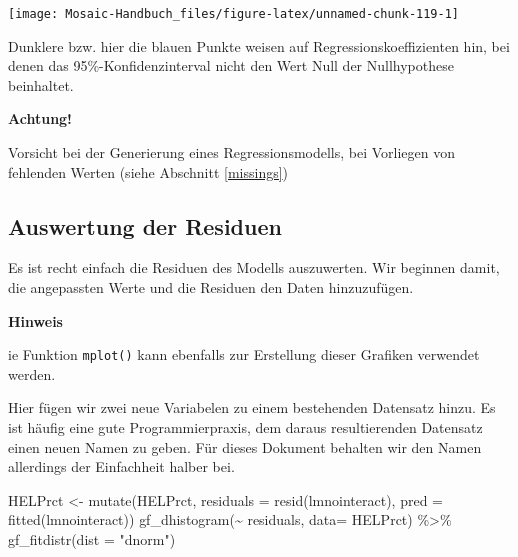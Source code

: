 \documentclass[
  ngerman,
]{scrbook}
\newenvironment{Shaded}{\begin{snugshade}}{\end{snugshade}}
\newcommand{\AttributeTok}[1]{\textcolor[rgb]{0.77,0.63,0.00}{#1}}
\newcommand{\FunctionTok}[1]{\textcolor[rgb]{0.00,0.00,0.00}{#1}}
\newcommand{\NormalTok}[1]{#1}
\newcommand{\OtherTok}[1]{\textcolor[rgb]{0.56,0.35,0.01}{#1}}
\newcommand{\SpecialCharTok}[1]{\textcolor[rgb]{0.00,0.00,0.00}{#1}}
\newcommand{\StringTok}[1]{\textcolor[rgb]{0.31,0.60,0.02}{#1}}
\newenvironment{hinweis}[1]
  {
  \begin{itemize}
  \renewcommand{\labelitemi}{
    \raisebox{1.8\height}[0pt][0pt]{
      {\setkeys{Gin}{width=7em,keepaspectratio}
        {\Large \textcolor{dark-fom-green}\faHandORight}}
        }
  }
  \begin{blackbox}
        \bgroup\color{dark-fom-green}
          {\textbf{Hinweis}}
        \egroup
  \item
  }
  {
  \end{blackbox}
  \end{itemize}
  }
\newenvironment{achtung}[1]
  {
  \begin{itemize}
  \renewcommand{\labelitemi}{
    \raisebox{1.8\height}[0pt][0pt]{
      {\setkeys{Gin}{width=7em,keepaspectratio}
        {\Large \textcolor{dark-fom-green}\faExclamationCircle}}
        }
  }
  \begin{blackbox}
        \bgroup\color{dark-fom-green}
          {\textbf{Achtung!}}
        \egroup
  \item
  }
  {
  \end{blackbox}
  \end{itemize}
  }
\newenvironment{note}[1]
  {
  \begin{itemize}
  \renewcommand{\labelitemi}{
    \raisebox{-.01\height}[0pt][0pt]{
      {\setkeys{Gin}{width=7em,keepaspectratio}
        {\normalsize \textcolor{dark-fom-green}\faHashtag}}
        }
  }
  \begin{blackbox}
   \item
    }
    {
  \end{blackbox}
  \end{itemize}
  }
\begin{document}
\begin{center}\texttt{[image: Mosaic-Handbuch\_files/figure-latex/unnamed-chunk-119-1]} \end{center}

\begin{note}{note}
Dunklere bzw. hier die blauen Punkte weisen auf Regressionskoeffizienten hin, bei denen das 95\%-Konfidenzinterval nicht den Wert Null der Nullhypothese beinhaltet.

\end{note}

\begin{achtung}{achtung}
Vorsicht bei der Generierung eines Regressionsmodells, bei Vorliegen von fehlenden Werten (siehe Abschnitt \ref{missings})

\end{achtung}

\hypertarget{auswertung-der-residuen}{%
\subsection{Auswertung der Residuen}\label{auswertung-der-residuen}}

Es ist recht einfach die Residuen des Modells auszuwerten. Wir beginnen damit, die angepassten Werte und die Residuen den Daten hinzuzufügen.

\begin{hinweis}
Die Funktion \texttt{mplot()} kann ebenfalls zur Erstellung dieser Grafiken verwendet werden.

\end{hinweis}

\begin{note}{note}
Hier fügen wir zwei neue Variabelen zu einem bestehenden Datensatz hinzu. Es ist häufig eine gute Programmierpraxis, dem daraus resultierenden Datensatz einen neuen Namen zu geben. Für dieses Dokument behalten wir den Namen allerdings der Einfachheit halber bei.

\end{note}

\begin{Shaded}
\begin{Highlighting}[]
\NormalTok{HELPrct }\OtherTok{\textless{}{-}} \FunctionTok{mutate}\NormalTok{(HELPrct, }
                  \AttributeTok{residuals =} \FunctionTok{resid}\NormalTok{(lmnointeract), }
                  \AttributeTok{pred =} \FunctionTok{fitted}\NormalTok{(lmnointeract))}
\FunctionTok{gf\_dhistogram}\NormalTok{(}\SpecialCharTok{\textasciitilde{}}\NormalTok{ residuals, }\AttributeTok{data=}\NormalTok{ HELPrct) }\SpecialCharTok{\%\textgreater{}\%}
  \FunctionTok{gf\_fitdistr}\NormalTok{(}\AttributeTok{dist =} \StringTok{"dnorm"}\NormalTok{)}
\end{Highlighting}
\end{Shaded}
\end{document}
